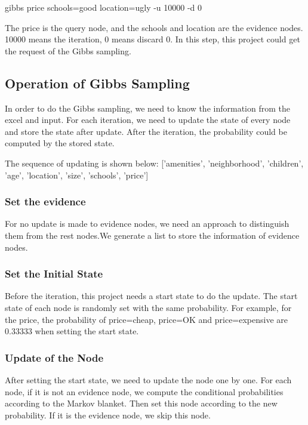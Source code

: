 \documentclass[11pt, a4paper]{article}
\begin{document}
gibbs price schools=good location=ugly -u 10000 -d 0

The price is the query node, and the schools and location are the evidence nodes. 10000 means the iteration, 0 means discard 0.
In this step, this project could get the request of the Gibbs sampling.


\subsection{Operation of Gibbs Sampling}

In order to do the Gibbs sampling, we need to know the information from the excel and input. For each iteration, we need to update the state of every node and store the state after update. After the iteration, the probability could be computed by the stored state.


The sequence of updating is shown below:
['amenities', 'neighborhood', 'children', 'age', 'location', 'size', 'schools', 'price']


\subsubsection{Set the evidence}

For no update is made to evidence nodes, we need an approach to distinguish them from the rest nodes.We generate a list to store the information of evidence nodes. 

\subsubsection{Set the Initial State}

Before the iteration, this project needs a start state to do the update. The start state of each node is randomly set with the same probability. For example, for the price, the probability of price=cheap, price=OK and price=expensive are 0.33333 when setting the start state.

\subsubsection{Update of the Node}

After setting the start state, we need to update the node one by one. 
For each node, if it is not an evidence node, we compute the conditional probabilities according to the Markov blanket. Then set this node according to the new probability. If it is the evidence node, we skip this node.
\end{document}
